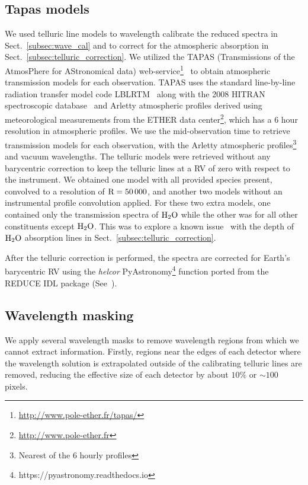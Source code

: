 \documentclass[fleqn,usenatbib]{mnras}
\begin{document}
\subsection{Tapas models}
\label{subsec:tapas_models}
We used telluric line models to wavelength calibrate the reduced spectra in Sect.~\ref{subsec:wave_cal} and to correct for the atmospheric absorption in Sect.~\ref{subsec:telluric_correction}. We utilized the TAPAS (Transmissions of the AtmosPhere for AStronomical data) web-service\footnote{\url{http://www.pole-ether.fr/tapas/}}~\citep{bertaux_tapas_2014} to obtain atmospheric transmission models for each observation. TAPAS uses the standard line-by-line radiation transfer model code LBLRTM~\citep{clough_linebyline_1995} along with the 2008 HITRAN spectroscopic database~\citep{rothman_hitran_2009} and Arletty atmospheric profiles derived using meteorological measurements from the ETHER data center\footnote{\url{http://www.pole-ether.fr}}, which has a 6 hour resolution in atmospheric profiles.
We use the mid-observation time to retrieve transmission models for each observation, with the Arletty atmospheric profiles\footnote{Nearest of the 6 hourly profiles} and vacuum wavelengths. The telluric models were retrieved without any barycentric correction to keep the telluric lines at a RV of zero with respect to the instrument. We obtained one model with all provided species present, convolved to a resolution of \(\rm R=50\,000 \), and another two models without an instrumental profile convolution applied. For these two extra models, one contained only the transmission spectra of \(\rm H_{2}O \) while the other was for all other constituents except \(\rm H_{2}O \). This was to explore a known issue~\citep{bertaux_tapas_2014} with the depth of \(\rm H_{2}O \) absorption lines in Sect.~\ref{subsec:telluric_correction}.

After the telluric correction is performed, the spectra are corrected for Earth's barycentric RV using the \emph{helcor} PyAstronomy\footnote{https://pyastronomy.readthedocs.io} function ported from the REDUCE IDL package (See~\citet[][]{piskunov_new_2002}).


\subsection{Wavelength masking}
We apply several wavelength masks to remove wavelength regions from which we cannot extract information.
Firstly, regions near the edges of each detector where the wavelength solution is extrapolated outside of the calibrating telluric lines are removed, reducing the effective size of each detector by about \(10\%\) or \(\sim100\) pixels. 
\end{document}
